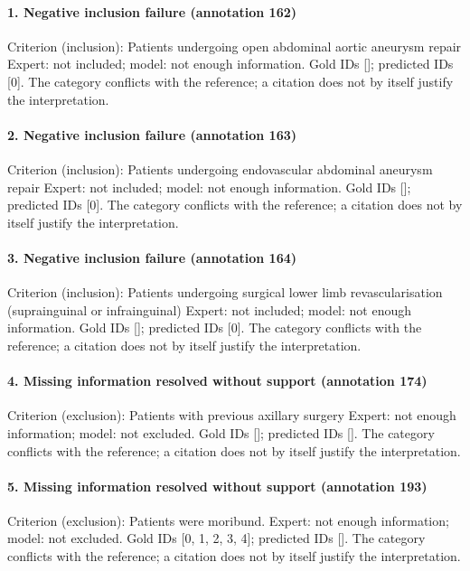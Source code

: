 \paragraph{1. Negative inclusion failure (annotation 162)}
Criterion (inclusion): Patients undergoing open abdominal aortic aneurysm repair Expert: not included; model: not enough information. Gold IDs []; predicted IDs [0]. The category conflicts with the reference; a citation does not by itself justify the interpretation.

\paragraph{2. Negative inclusion failure (annotation 163)}
Criterion (inclusion): Patients undergoing endovascular abdominal aneurysm repair Expert: not included; model: not enough information. Gold IDs []; predicted IDs [0]. The category conflicts with the reference; a citation does not by itself justify the interpretation.

\paragraph{3. Negative inclusion failure (annotation 164)}
Criterion (inclusion): Patients undergoing surgical lower limb revascularisation (suprainguinal or infrainguinal) Expert: not included; model: not enough information. Gold IDs []; predicted IDs [0]. The category conflicts with the reference; a citation does not by itself justify the interpretation.

\paragraph{4. Missing information resolved without support (annotation 174)}
Criterion (exclusion): Patients with previous axillary surgery Expert: not enough information; model: not excluded. Gold IDs []; predicted IDs []. The category conflicts with the reference; a citation does not by itself justify the interpretation.

\paragraph{5. Missing information resolved without support (annotation 193)}
Criterion (exclusion): Patients were moribund. Expert: not enough information; model: not excluded. Gold IDs [0, 1, 2, 3, 4]; predicted IDs []. The category conflicts with the reference; a citation does not by itself justify the interpretation.

